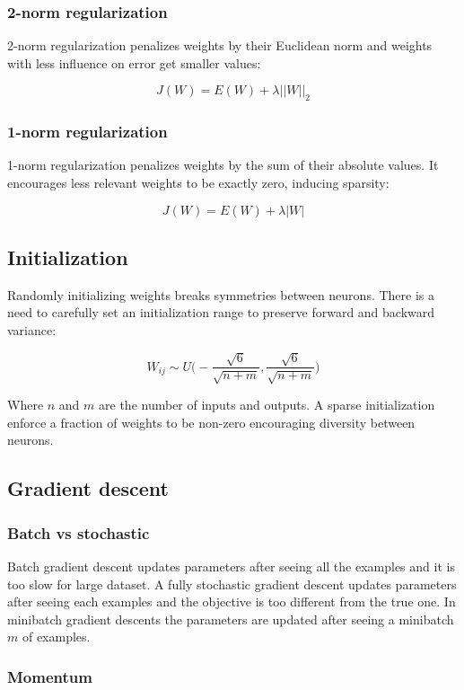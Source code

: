 		\subsubsection{2-norm regularization}
		2-norm regularization penalizes weights by their Euclidean norm and weights with less influence on error get smaller values:

		$$J(W) = E(W) + \lambda||W||_2$$

		\subsubsection{1-norm regularization}
		1-norm regularization penalizes weights by the sum of their absolute values.
		It encourages less relevant weights to be exactly zero, inducing sparsity:

		$$J(W) = E(W) + \lambda|W|$$

	\subsection{Initialization}
	Randomly initializing weights breaks symmetries between neurons.
	There is a need to carefully set an initialization range to preserve forward and backward variance:

	$$W_{ij} \sim U\biggl(-\frac{\sqrt{6}}{\sqrt{n+m}},\frac{\sqrt{6}}{\sqrt{n+m}}\biggr)$$

	Where $n$ and $m$ are the number of inputs and outputs.
	A sparse initialization enforce a fraction of weights to be non-zero encouraging diversity between neurons.

	\subsection{Gradient descent}

		\subsubsection{Batch vs stochastic}
		Batch gradient descent updates parameters after seeing all the examples and it is too slow for large dataset.
		A fully stochastic gradient descent updates parameters after seeing each examples and the objective is too different from the true one.
		In minibatch gradient descents the parameters are updated after seeing a minibatch $m$ of examples.

		\subsubsection{Momentum}


